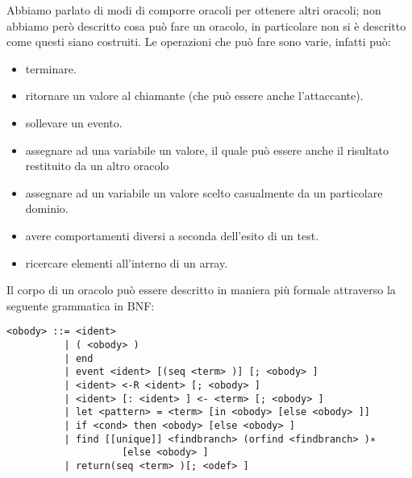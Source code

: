 \documentclass[a4paper,openright,twoside,12pt]{report}
\begin{document}
Abbiamo parlato di modi di comporre oracoli per ottenere altri oracoli; non abbiamo per\`o descritto cosa pu\`o fare un oracolo, in particolare non si \`e 
descritto come questi siano costruiti.
Le operazioni che pu\`o fare sono varie, infatti pu\`o:
\begin{itemize}
 \item terminare.
 \item ritornare un valore al chiamante (che pu\`o essere anche l'attaccante).
 \item sollevare un evento.
 \item assegnare ad una variabile un valore, il quale pu\`o essere anche il risultato restituito da un altro oracolo
 \item assegnare ad un variabile un valore scelto casualmente da un particolare dominio.
 \item avere comportamenti diversi a seconda dell'esito di un test.
 \item ricercare elementi all'interno di un array.
\end{itemize}
Il corpo di un oracolo pu\`o essere descritto in maniera pi\`u formale attraverso la seguente grammatica in BNF:

\begin{verbatim}
<obody> ::= <ident>
          | ( <obody> )
          | end
          | event <ident> [(seq <term> )] [; <obody> ]
          | <ident> <-R <ident> [; <obody> ]
          | <ident> [: <ident> ] <- <term> [; <obody> ]
          | let <pattern> = <term> [in <obody> [else <obody> ]]
          | if <cond> then <obody> [else <obody> ]
          | find [[unique]] <findbranch> (orfind <findbranch> )∗ 
                    [else <obody> ]
          | return(seq <term> )[; <odef> ]
\end{verbatim}
\end{document}
